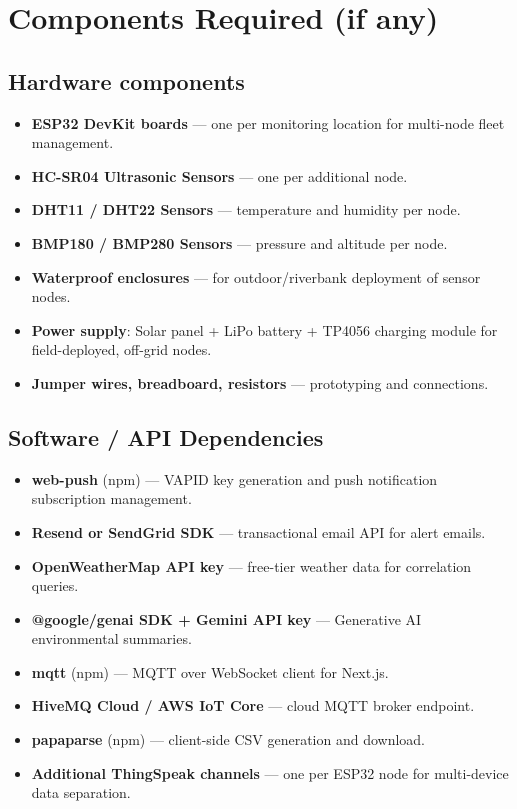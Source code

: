 \documentclass[10pt,a4paper]{article}
\begin{document}
\vspace{0.4cm}

\section*{Components Required (if any)}

\subsection*{Hardware components}
\begin{itemize}[leftmargin=1.8em, itemsep=2pt]
    \item \textbf{ESP32 DevKit boards} --- one per monitoring location for
          multi-node fleet management.
    \item \textbf{HC-SR04 Ultrasonic Sensors} --- one per additional node.
    \item \textbf{DHT11 / DHT22 Sensors} --- temperature and humidity per node.
    \item \textbf{BMP180 / BMP280 Sensors} --- pressure and altitude per node.
    \item \textbf{Waterproof enclosures} --- for outdoor/riverbank deployment of sensor
          nodes.
    \item \textbf{Power supply}: Solar panel + LiPo battery + TP4056 charging module for
          field-deployed, off-grid nodes.
    \item \textbf{Jumper wires, breadboard, resistors} --- prototyping and connections.
\end{itemize}

\subsection*{Software / API Dependencies}
\begin{itemize}[leftmargin=1.8em, itemsep=2pt]
    \item \textbf{web-push} (npm) --- VAPID key generation and push notification
          subscription management.
    \item \textbf{Resend or SendGrid SDK} --- transactional email API for alert emails.
    \item \textbf{OpenWeatherMap API key} --- free-tier weather data for correlation
          queries.
    \item \textbf{@google/genai SDK + Gemini API key} --- Generative AI environmental
          summaries.
    \item \textbf{mqtt} (npm) --- MQTT over WebSocket client for Next.js.
    \item \textbf{HiveMQ Cloud / AWS IoT Core} --- cloud MQTT broker endpoint.
    \item \textbf{papaparse} (npm) --- client-side CSV generation and download.
    \item \textbf{Additional ThingSpeak channels} --- one per ESP32 node for multi-device
          data separation.
\end{itemize}
\end{document}

